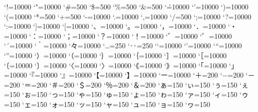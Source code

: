 \prebreakpenalty`!=10000
\prebreakpenalty`"=10000
\postbreakpenalty`\#=500
\postbreakpenalty`\$=500
\postbreakpenalty`\%=500
\postbreakpenalty`\&=500
\postbreakpenalty`\`=10000
\prebreakpenalty`'=10000
\prebreakpenalty`)=10000
\postbreakpenalty`(=10000
\prebreakpenalty`*=500
\prebreakpenalty`+=500
\prebreakpenalty`-=10000
\prebreakpenalty`.=10000
\prebreakpenalty`,=10000
\prebreakpenalty`/=500
\prebreakpenalty`;=10000
\prebreakpenalty`?=10000
\prebreakpenalty`:=10000
\prebreakpenalty`]=10000
\postbreakpenalty`[=10000
\prebreakpenalty`、=10000
\prebreakpenalty`。=10000
\prebreakpenalty`，=10000
\prebreakpenalty`．=10000
\prebreakpenalty`・=10000
\prebreakpenalty`：=10000
\prebreakpenalty`；=10000
\prebreakpenalty`？=10000
\prebreakpenalty`！=10000
\prebreakpenalty`゛=10000%
\prebreakpenalty`゜=10000%
\prebreakpenalty`´=10000%
\postbreakpenalty`｀=10000%
\prebreakpenalty`々=10000%
\prebreakpenalty`…=250%
\prebreakpenalty`‥=250%
\postbreakpenalty`‘=10000%
\prebreakpenalty`’=10000%
\postbreakpenalty`“=10000%
\prebreakpenalty`”=10000%
\prebreakpenalty`）=10000
\postbreakpenalty`（=10000
\prebreakpenalty`｝=10000
\postbreakpenalty`｛=10000
\prebreakpenalty`］=10000
\postbreakpenalty`［=10000
\postbreakpenalty`〔=10000%
\prebreakpenalty`〕=10000%
\postbreakpenalty`〈=10000%
\prebreakpenalty`〉=10000%
\postbreakpenalty`《=10000%
\prebreakpenalty`》=10000%
\postbreakpenalty`「=10000%
\prebreakpenalty`」=10000%
\postbreakpenalty`『=10000%
\prebreakpenalty`』=10000%
\postbreakpenalty`【=10000%
\prebreakpenalty`】=10000%
\prebreakpenalty`ー=10000
\prebreakpenalty`＋=200
\prebreakpenalty`−=200%
\prebreakpenalty`－=200%
\prebreakpenalty`＝=200
\postbreakpenalty`＃=200
\postbreakpenalty`＄=200
\postbreakpenalty`％=200
\postbreakpenalty`＆=200
\prebreakpenalty`ぁ=150
\prebreakpenalty`ぃ=150
\prebreakpenalty`ぅ=150
\prebreakpenalty`ぇ=150
\prebreakpenalty`ぉ=150
\prebreakpenalty`っ=150
\prebreakpenalty`ゃ=150
\prebreakpenalty`ゅ=150
\prebreakpenalty`ょ=150
\prebreakpenalty`ゎ=150%
\prebreakpenalty`ァ=150
\prebreakpenalty`ィ=150
\prebreakpenalty`ゥ=150
\prebreakpenalty`ェ=150
\prebreakpenalty`ォ=150
\prebreakpenalty`ッ=150
\prebreakpenalty`ャ=150
\prebreakpenalty`ュ=150
\prebreakpenalty`ョ=150
\prebreakpenalty`ヮ=150%
